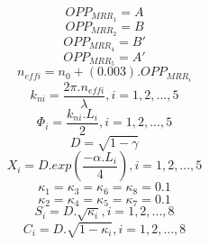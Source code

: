 \documentclass{osa-article}
\begin{document}
\begin{equation}
  OPP_{MRR_{1}}=A
  \label{eqa7}
\end{equation}
  \begin{equation}
  OPP_{MRR_{2}}=B
  \label{eqa8}
\end{equation}
  \begin{equation}
  OPP_{MRR_{4}}=B'
  \label{eqa9}
\end{equation}
  \begin{equation}
  OPP_{MRR_{5}}=A'
  \label{eqa10}
\end{equation}
  \begin{equation}
  n_{effi}=n_0+(0.003).OPP_{MRR_{i}}
\label{eqa11}
\end{equation}
 \begin{equation}
k_{ni}=\frac{2{\pi}.n_{effi}}{\lambda}, i=1, 2, ..., 5
\label{eqa12}
\end{equation}
 \begin{equation}
\Phi_{i}=\frac{k_{ni}.L_{i}}{2}, i=1, 2, ..., 5
\label{eqa13}
\end{equation}
 \begin{equation}
D=\sqrt{1-\gamma}
\label{eqa14}
\end{equation}
 \begin{equation}
X_{i}=D.exp(\frac{-\alpha.L_{i}}{4}), i=1, 2, ...,5
\label{eqa15}
\end{equation}
 \begin{equation}
\kappa_1=\kappa_3=\kappa_6=\kappa_8=0.1
\label{eqa16}
\end{equation}
 \begin{equation}
\kappa_2=\kappa_4=\kappa_5=\kappa_7=0.1
\label{eqa17}
\end{equation}
 \begin{equation}
S_i=D.\sqrt{\kappa_i}, i=1, 2, ..., 8
\label{eqa18}
\end{equation}
 \begin{equation}
C_i=D.\sqrt{1-\kappa_i}, i=1, 2, ..., 8
\label{eqa19}
\end{equation}
\end{document}
